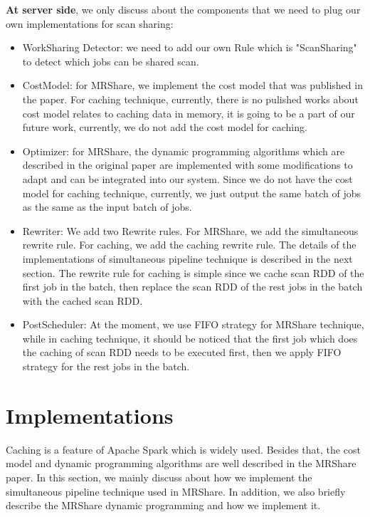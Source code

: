 \textbf{At server side}, we only discuss about the components that we need to plug our own implementations for scan sharing:
\begin{itemize}
\item WorkSharing Detector: we need to add our own Rule which is "ScanSharing" to detect which jobs can be shared scan.
\item CostModel: for MRShare, we implement the cost model that was published in the paper. For caching technique, currently, there is no pulished works about cost model relates to caching data in memory, it is going to be a part of our future work, currently, we do not add the cost model for caching.
\item Optimizer: for MRShare, the dynamic programming algorithms which are described in the original paper are implemented with some modifications to adapt and can be integrated into our system. Since we do not have the cost model for caching technique, currently, we just output the same batch of jobs as the same as the input batch of jobs.
\item Rewriter: We add two Rewrite rules. For MRShare, we add the simultaneous rewrite rule. For caching, we add the caching rewrite rule. The details of the implementations of simultaneous pipeline technique is described in the next section. The rewrite rule for caching is simple since we cache scan RDD of the first job in the batch, then replace the scan RDD of the rest jobs in the batch with the cached scan RDD.
\item PostScheduler: At the moment, we use FIFO strategy for MRShare technique, while in caching technique, it should be noticed that the first job which does the caching of scan RDD needs to be executed first, then we apply FIFO strategy for the rest jobs in the batch.
\end{itemize} 

\section{Implementations}

Caching is a feature of Apache Spark which is widely used. Besides that, the cost model and dynamic programming algorithms are well described in the MRShare paper. In this section, we mainly discuss about how we implement the simultaneous pipeline technique used in MRShare. In addition, we also briefly describe the MRShare dynamic programming and how we implement it.

